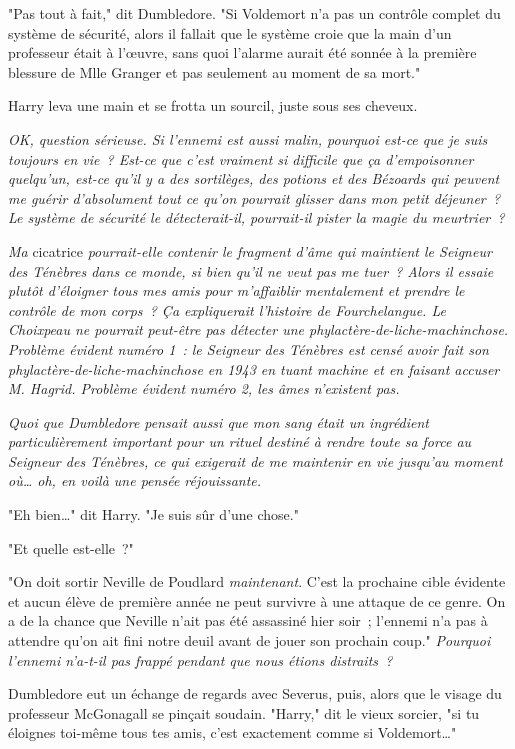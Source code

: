 "Pas tout à fait," dit Dumbledore. "Si Voldemort n'a pas un contrôle complet du système de sécurité, alors il fallait que le système croie que la main d'un professeur était à l'œuvre, sans quoi l'alarme aurait été sonnée à la première blessure de Mlle Granger et pas seulement au moment de sa mort."

Harry leva une main et se frotta un sourcil, juste sous ses cheveux.

\emph{OK, question sérieuse. Si l'ennemi est aussi malin, pourquoi est-ce que je suis toujours en vie~? Est-ce que c'est vraiment si difficile que ça d'empoisonner quelqu'un, est-ce qu'il y a des sortilèges, des potions et des Bézoards qui peuvent me guérir d'absolument tout ce qu'on pourrait glisser dans mon petit déjeuner~? Le système de sécurité le détecterait-il, pourrait-il pister la magie du meurtrier~?}

\emph{Ma} cicatrice \emph{pourrait-elle contenir le fragment d'âme qui maintient le Seigneur des Ténèbres dans ce monde, si bien qu'il ne veut pas me tuer~? Alors il essaie plutôt d'éloigner tous mes amis pour m'affaiblir mentalement et prendre le contrôle de mon corps~? Ça expliquerait l'histoire de Fourchelangue. Le Choixpeau ne pourrait peut-être pas détecter une phylactère-de-liche-machinchose. Problème évident numéro 1~: le Seigneur des Ténèbres est censé avoir fait son phylactère-de-liche-machinchose en 1943 en tuant machine et en faisant accuser M. Hagrid. Problème évident numéro 2, les âmes n'existent pas.}

\emph{Quoi que Dumbledore pensait aussi que mon sang était un ingrédient particulièrement important pour un rituel destiné à rendre toute sa force au Seigneur des Ténèbres, ce qui exigerait de me maintenir en vie jusqu'au moment où… oh, en voilà une pensée réjouissante.}

"Eh bien…" dit Harry. "Je suis sûr d'une chose."

"Et quelle est-elle~?"

"On doit sortir Neville de Poudlard \emph{maintenant}. C'est la prochaine cible évidente et aucun élève de première année ne peut survivre à une attaque de ce genre. On a de la chance que Neville n'ait pas été assassiné hier soir~; l'ennemi n'a pas à attendre qu'on ait fini notre deuil avant de jouer son prochain coup." \emph{Pourquoi l'ennemi n'a-t-il pas frappé pendant que nous étions distraits~?}

Dumbledore eut un échange de regards avec Severus, puis, alors que le visage du professeur McGonagall se pinçait soudain. "Harry," dit le vieux sorcier, "si tu éloignes toi-même tous tes amis, c'est exactement comme si Voldemort…"

